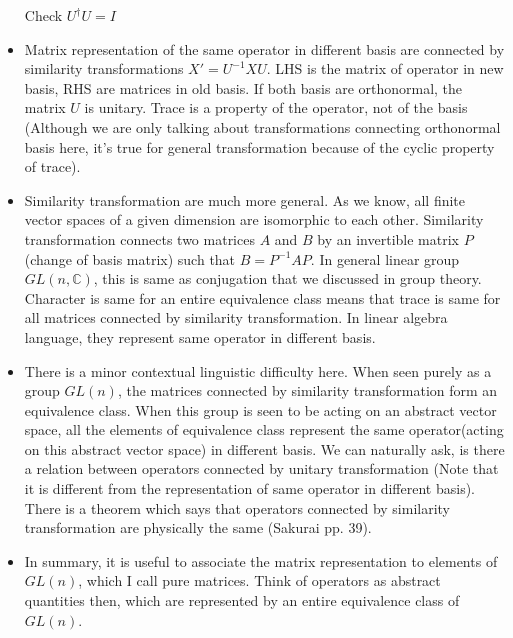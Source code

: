 \documentclass{report}
\begin{document}
\begin{itemize}
  Check $U^\dag U = I$

\item Matrix representation of the same operator in different basis are connected by similarity transformations $X' =U^{-1}XU$. LHS is the matrix of operator in new basis, RHS are matrices in old basis. If both basis are orthonormal, the matrix $U$ is unitary. Trace is a property of the operator, not of the basis (Although we are only talking about transformations connecting orthonormal basis here, it's true for general transformation because of the cyclic property of trace).\\

\item Similarity transformation are much more general. As we know, all finite vector spaces of a given dimension are isomorphic to each other. Similarity transformation connects two matrices $A$ and $B$ by an invertible matrix $P$(change of basis matrix) such that $B = P^{-1}AP$. In general linear group $GL(n,\mathbb{C})$, this is same as conjugation that we discussed in group theory. Character is same for an entire equivalence class means that trace is same for all matrices connected by similarity transformation. In linear algebra language, they represent same operator in different basis.\\

\item There is a minor contextual linguistic difficulty here. When seen purely as a group $GL(n)$, the matrices connected by similarity transformation form an equivalence class. When this group is seen to be acting on an abstract vector space, all the elements of equivalence class represent the same operator(acting on this abstract vector space) in different basis. We can naturally ask, is there a relation between operators connected by unitary transformation (Note that it is different from the representation of same operator in different basis). There is a theorem which says that operators connected by similarity transformation are physically the same (Sakurai pp. 39).\\

\item In summary, it is useful to associate the matrix representation to elements of $GL(n)$, which I call pure matrices. Think of operators as abstract quantities then, which are represented by an entire equivalence class of $GL(n)$.


\end{itemize}
\end{document}
